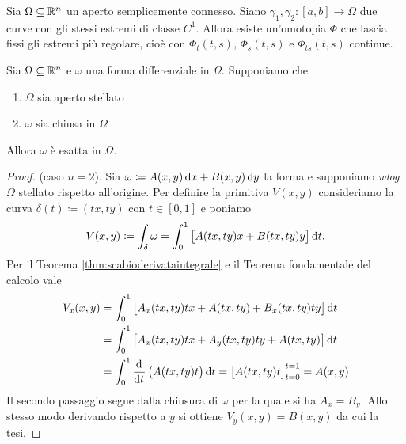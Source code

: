 \begin{lemma} \label{lem:omotopiaregolare}
	Sia $ \Omega \subseteq \mathbb{R}^n $ un aperto semplicemente connesso. Siano $ \gamma_1, \gamma_2 \colon [a, b] \to \Omega $ due curve con gli stessi estremi di classe $ C^1 $. Allora esiste un'omotopia $ \Phi $ che lascia fissi gli estremi più regolare, cioè con $ \Phi_t(t, s) $, $ \Phi_s(t, s) $ e $ \Phi_{ts}(t, s) $ continue.
\end{lemma}

\begin{thm}
	Sia $ \Omega \subseteq \mathbb{R}^n $ e $ \omega $ una forma differenziale in $ \Omega $. Supponiamo che
	\begin{enumerate}[label = (\roman*)]
		\item $ \Omega $ sia aperto stellato
		\item $ \omega $ sia chiusa in $ \Omega $
	\end{enumerate}
	Allora $ \omega $ è esatta in $ \Omega $.
\end{thm}
%
\begin{proof}
	(caso $ n = 2 $).
	Sia $ \omega \coloneqq A(x, y) \dif{x} + B(x, y) \dif{y} $ la forma e supponiamo \emph{wlog} $ \Omega $ stellato rispetto all'origine. Per definire la primitiva $ V(x, y) $ consideriamo la curva $ \delta(t) \coloneqq (t x, t y) $ con $ t \in [0, 1] $ e poniamo
	\[
		V(x, y) \coloneqq \int_{\delta} \omega = \int_{0}^{1} \left[A(tx, ty) x + B(tx, ty) y\right] \dif{t}.
	\]
	Per il Teorema \ref{thm:scabioderivataintegrale} e il Teorema fondamentale del calcolo vale
	\begin{align*}
		V_x(x, y) & = \int_{0}^{1} \left[A_x(tx, ty) tx + A(tx, ty) + B_x(tx, ty) ty\right] \dif{t} \\
		& = \int_{0}^{1} \left[A_x(tx, ty) tx + A_y(tx, ty) ty + A(tx, ty) \right] \dif{t} \\
		& = \int_{0}^{1} \dod{}{t}\left(A(tx, ty) t\right) \dif{t} = \left[A(tx, ty) t\right]_{t = 0}^{t = 1} = A(x, y)
	\end{align*}
	Il secondo passaggio segue dalla chiusura di $ \omega $ per la quale si ha $ A_x = B_y $. Allo stesso modo derivando rispetto a $ y $ si ottiene $ V_y(x, y) = B(x, y) $ da cui la tesi.
\end{proof}
%
